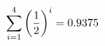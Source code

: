 \documentclass[preview]{standalone}
\begin{document}
\begin{align*}
\sum_{i=1}^{ 4 } \left({ 1 } \over {2} \right)^i = { 0.9375 }
\end{align*}
\end{document}
